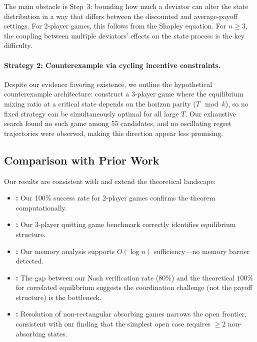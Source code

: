 \documentclass[11pt,a4paper]{article}
\theoremstyle{definition}
\begin{document}
The main obstacle is Step~3: bounding how much a deviator can alter the state distribution in a way that differs between the discounted and average-payoff settings.
For 2-player games, this follows from the Shapley equation.
For $n \geq 3$, the coupling between multiple deviators' effects on the state process is the key difficulty.

\paragraph{Strategy 2: Counterexample via cycling incentive constraints.}
Despite our evidence favoring existence, we outline the hypothetical counterexample architecture:
construct a 3-player game where the equilibrium mixing ratio at a critical state depends on the horizon parity ($T \mod k$), so no fixed strategy can be simultaneously optimal for all large $T$.
Our exhaustive search found no such game among 55 candidates, and no oscillating regret trajectories were observed, making this direction appear less promising.

\subsection{Comparison with Prior Work}

Our results are consistent with and extend the theoretical landscape:

\begin{itemize}[leftmargin=1.5em]
    \item \textbf{\citet{vieille2000a}:} Our 100\% success rate for 2-player games confirms the theorem computationally.
    \item \textbf{\citet{solan1999three}:} Our 3-player quitting game benchmark correctly identifies equilibrium structure.
    \item \textbf{\citet{hansen2025limited}:} Our memory analysis supports $O(\log n)$ sufficiency---no memory barrier detected.
    \item \textbf{\citet{solan2002correlated}:} The gap between our Nash verification rate ($80\%$) and the theoretical $100\%$ for correlated equilibrium suggests the coordination challenge (not the payoff structure) is the bottleneck.
    \item \textbf{\citet{solan2025undiscounted}:} Resolution of non-rectangular absorbing games narrows the open frontier, consistent with our finding that the simplest open case requires $\geq 2$ non-absorbing states.
\end{itemize}
\end{document}
